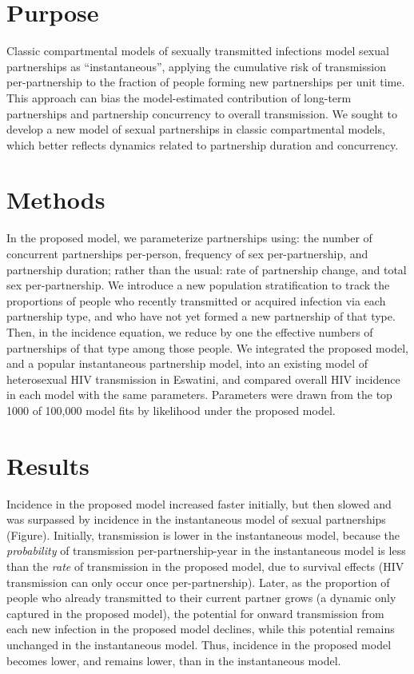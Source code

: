 \section{Purpose}
Classic compartmental models of sexually transmitted infections
model sexual partnerships as ``instantaneous'',
applying the cumulative risk of transmission per-partnership
to the fraction of people forming new partnerships per unit time.
This approach can bias the model-estimated contribution of
long-term partnerships and partnership concurrency to overall transmission.
We sought to develop a new model of sexual partnerships in classic compartmental models,
which better reflects dynamics related to partnership duration and concurrency.
\section{Methods}
In the proposed model, we parameterize partnerships using:
the number of concurrent partnerships per-person, frequency of sex per-partnership, and partnership duration;
rather than the usual: rate of partnership change, and total sex per-partnership.
We introduce a new population stratification to track the proportions of people
who recently transmitted or acquired infection via each partnership type,
and who have not yet formed a new partnership of that type.
Then, in the incidence equation, we reduce by one
the effective numbers of partnerships of that type among those people.
We integrated the proposed model, and a popular instantaneous partnership model,
into an existing model of heterosexual HIV transmission in Eswatini,
and compared overall HIV incidence in each model with the same parameters.
Parameters were drawn from the top 1000 of 100,000 model fits by likelihood under the proposed model.
\section{Results}
Incidence in the proposed model increased faster initially, but then slowed and was surpassed by
incidence in the instantaneous model of sexual partnerships (Figure).
Initially, transmission is lower in the instantaneous model,
because the \emph{probability} of transmission per-partnership-year in the instantaneous model
is less than the \emph{rate} of transmission in the proposed model,
due to survival effects (HIV transmission can only occur once per-partnership).
Later, as the proportion of people who already transmitted to their current partner grows
(a dynamic only captured in the proposed model),
the potential for onward transmission from each new infection in the proposed model declines,
while this potential remains unchanged in the instantaneous model.
Thus, incidence in the proposed model becomes lower, and remains lower,
than in the instantaneous model.
